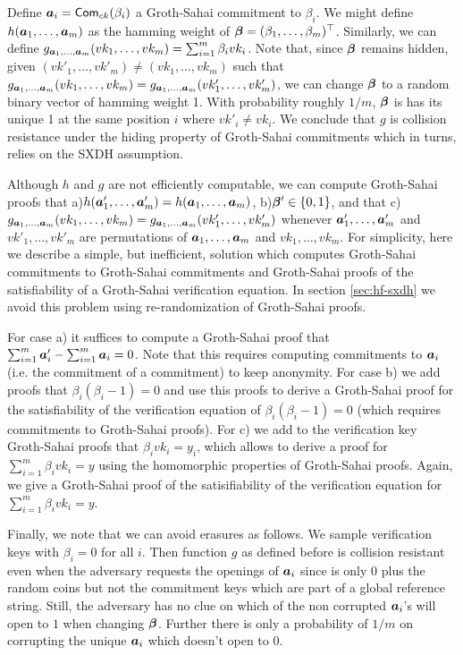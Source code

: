 Define ${\boldsymbol{a}}_i = \mathsf{Com}_{ck}(\beta_i)$ a Groth-Sahai commitment to $\beta_i$. We might define $h({\boldsymbol{a}}_1,\ldots,{\boldsymbol{a}}_m)$ as the hamming weight of ${\boldsymbol{\beta}} = (\beta_1,\ldots,\beta_m)^\top$.
Similarly, we can define $g_{{\boldsymbol{a}}_1,\ldots,{\boldsymbol{a}}_m}(vk_1,\ldots,vk_m) = \sum_{i=1}^m \beta_ivk_i$. Note that, since ${\boldsymbol{\beta}}$ remains hidden, given $(vk'_1,\ldots,vk'_m)\neq (vk_1,\ldots,vk_m)$ such that $g_{{\boldsymbol{a}}_1,\ldots,{\boldsymbol{a}}_m}(vk_1,\ldots,vk_m) =g_{{\boldsymbol{a}}_1,\ldots,{\boldsymbol{a}}_m}(vk'_1,\ldots,vk'_m)$, we can change ${\boldsymbol{\beta}}$ to a random binary vector of hamming weight 1. With probability roughly $1/m$, ${\boldsymbol{\beta}}$ is has its unique 1 at the same position $i$ where $vk'_i \neq vk_i$. We conclude that $g$ is collision resistance under the hiding property of Groth-Sahai commitments which in turns, relies on the SXDH assumption.

Although $h$ and $g$ are not efficiently computable, we can compute Groth-Sahai proofs that a)$h({\boldsymbol{a}}'_1,\ldots,{\boldsymbol{a}}'_m)=h({\boldsymbol{a}}_1,\ldots,{\boldsymbol{a}}_m)$, b)${\boldsymbol{\beta}}'\in\{0,1\}$, and that c)$g_{{\boldsymbol{a}}_1,\ldots,{\boldsymbol{a}}_m}(vk_1,\ldots,vk_m) =g_{{\boldsymbol{a}}_1,\ldots,{\boldsymbol{a}}_m}(vk'_1,\ldots,vk'_m)$ whenever ${\boldsymbol{a}}'_1,\ldots,{\boldsymbol{a}}'_m$ and $vk'_1,\ldots,vk'_m$ are permutations of ${\boldsymbol{a}}_1,\ldots,{\boldsymbol{a}}_m$ and $vk_1,\ldots,vk_m$. For simplicity, here we describe a simple, but inefficient, solution which computes Groth-Sahai commitments to Groth-Sahai commitments and Groth-Sahai proofs of the satisfiability of a Groth-Sahai verification equation. In section \ref{sec:hf-sxdh} we avoid this problem using re-randomization of Groth-Sahai proofs.
 
For case a) it suffices to compute a Groth-Sahai proof that $\sum_{i=1}^m {\boldsymbol{a}}'_i - \sum_{i=1}^m{\boldsymbol{a}}_i = 0$. Note that this requires computing commitments to ${\boldsymbol{a}}_i$ (i.e. the commitment of a commitment) to keep anonymity. For  case b) we add proofs that $\beta_i(\beta_i-1)=0$ and use this proofs to derive a Groth-Sahai proof for the satisfiability of the verification equation of $\beta_i(\beta_i-1)=0$ (which requires commitments to Groth-Sahai proofs). For c) we add to the verification key Groth-Sahai proofs that $\beta_i vk_i = y_i$, which allows to derive a proof for $\sum_{i=1}^m \beta_i vk_i = y$ using the homomorphic properties of Groth-Sahai proofs. Again, we give a Groth-Sahai proof of the satisifiability of the verification equation for $\sum_{i=1}^m \beta_i vk_i = y$.

Finally, we note that we can avoid erasures as follows. We sample verification keys with $\beta_i=0$ for all $i$. Then function $g$ as defined before is collision resistant even when the adversary requests the openings of ${\boldsymbol{a}}_i$ since is only $0$ plus the random coins but not the commitment keys which are part of a global reference string. Still, the adversary has no clue on which of the non corrupted ${\boldsymbol{a}}_i$'s will open to $1$ when changing ${\boldsymbol{\beta}}$. Further there is only a probability of $1/m$ on corrupting the unique ${\boldsymbol{a}}_i$ which doesn't open to 0.


